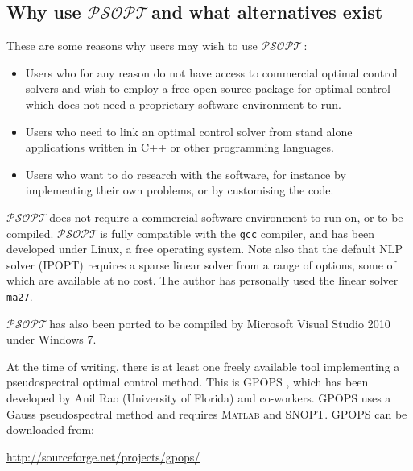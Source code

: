 \documentclass[a4paper,11pt]{report}    %
\newcommand{\psopt}{$\mathcal{PSOPT}$\,}  %
\begin{document}
\subsection{Why use \psopt and what alternatives exist}

These are
some reasons why users may wish to use \psopt:

\begin{itemize}
\item Users who for any reason do not have access to commercial optimal control solvers
and wish to employ a free open source package for optimal control which does not
need a proprietary software environment to run.
\item Users who need to link an optimal control solver from  stand alone applications written
in C++ or other programming languages.
\item Users who want to do research with the software, for instance by implementing
their own problems, or by customising the code.
\end{itemize}

\psopt does not require a commercial software environment to run on, 
or to be compiled. \psopt is fully compatible with the \texttt{gcc} compiler, and has
been developed under Linux, a free operating system.
Note also that the default NLP solver (IPOPT) requires a sparse linear solver
from a range of options, some of which are available at no cost. The author has personally 
used the linear solver \texttt{ma27}. 

\psopt has also been ported to be compiled by Microsoft Visual Studio 2010 under Windows 7.

At the time of writing, there is at least one freely available tool implementing 
a pseudospectral optimal control method. This is GPOPS \cite{Rao:08}, which has been
developed by Anil Rao (University of Florida) and co-workers. GPOPS
uses a Gauss pseudospectral method and requires \textsc{Matlab} and SNOPT. GPOPS
can be downloaded from: 
\begin{center}
\href{http://sourceforge.net/projects/gpops/}{http://sourceforge.net/projects/gpops/}
\end{center}
\end{document}
